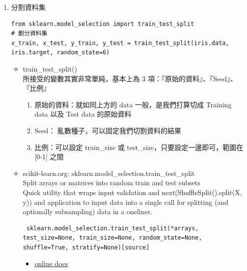\documentclass[a4paper,12pt]{article}
\begin{document}
\begin{enumerate}
\begin{enumerate}
\item 分割資料集\\
\lstset{breaklines=true,language=Python,label= ,caption= ,captionpos=b,firstnumber=1,numbers=left}
\begin{lstlisting}
from sklearn.model_selection import train_test_split
# 劃分資料集
x_train, x_test, y_train, y_test = train_test_split(iris.data, iris.target, random_state=6)
\end{lstlisting}

\begin{itemize}
\item train\_test\_split()\\
所接受的變數其實非常單純，基本上為 3 項：『原始的資料』、『Seed』、『比例』\\
\begin{enumerate}
\item 原始的資料：就如同上方的 data 一般，是我們打算切成 Training data 以及 Test data 的原始資料\\
\item Seed： 亂數種子，可以固定我們切割資料的結果\\
\item 比例：可以設定 train\_size 或 test\_size，只要設定一邊即可，範圍在 [0-1] 之間\\
\end{enumerate}
\item scikit-learn.org: sklearn.model\_selection.train\_test\_split\\

Split arrays or matrices into random train and test subsets\\

Quick utility that wraps input validation and next(ShuffleSplit().split(X, y)) and application to input data into a single call for splitting (and optionally subsampling) data in a oneliner.\\
\lstset{breaklines=true,language=Python,label= ,caption= ,captionpos=b,firstnumber=1,numbers=left}
\begin{lstlisting}
 sklearn.model_selection.train_test_split(*arrays, test_size=None, train_size=None, random_state=None, shuffle=True, stratify=None)[source]
\end{lstlisting}

\begin{itemize}
\item \href{https://scikit-learn.org/stable/modules/generated/sklearn.model\_selection.train\_test\_split.html}{online docs}\\
\end{itemize}
\end{itemize}


\end{enumerate}
\end{enumerate}
\end{document}
